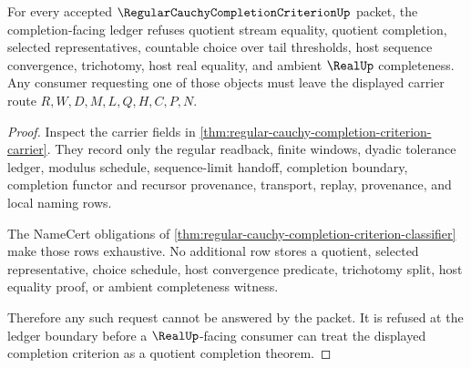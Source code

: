 \begin{theorem}
\label{thm:regular-cauchy-completion-criterion-ledger}
For every accepted $\RegularCauchyCompletionCriterionUp$ packet, the completion-facing ledger refuses quotient stream equality, quotient completion, selected representatives, countable choice over tail thresholds, host sequence convergence, trichotomy, host real equality, and ambient $\RealUp$ completeness. Any consumer requesting one of those objects must leave the displayed carrier route $R,W,D,M,L,Q,H,C,P,N$.
\end{theorem}
\begin{proof}
Inspect the carrier fields in \autoref{thm:regular-cauchy-completion-criterion-carrier}. They record only the regular readback, finite windows, dyadic tolerance ledger, modulus schedule, sequence-limit handoff, completion boundary, completion functor and recursor provenance, transport, replay, provenance, and local naming rows.

The NameCert obligations of \autoref{thm:regular-cauchy-completion-criterion-classifier} make those rows exhaustive. No additional row stores a quotient, selected representative, choice schedule, host convergence predicate, trichotomy split, host equality proof, or ambient completeness witness.

Therefore any such request cannot be answered by the packet. It is refused at the ledger boundary before a $\RealUp$-facing consumer can treat the displayed completion criterion as a quotient completion theorem.
\end{proof}

